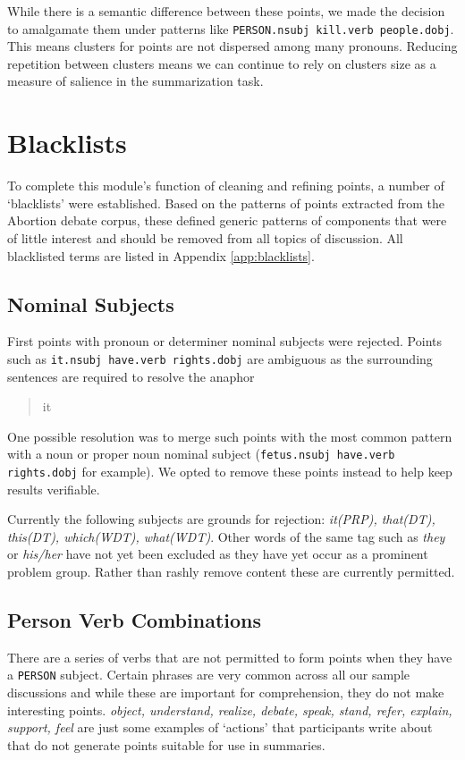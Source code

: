     While there is a semantic difference between these points, we made the decision to amalgamate them under patterns like \texttt{PERSON.nsubj kill.verb people.dobj}. This means clusters for points are not dispersed among many pronouns. Reducing repetition between clusters means we can continue to rely on clusters size as a measure of salience in the summarization task.

  \section{Blacklists}
  To complete this module's function of cleaning and refining points, a number of `blacklists' were established. Based on the patterns of points extracted from the Abortion debate corpus, these defined generic patterns of components that were of little interest and should be removed from all topics of discussion. All blacklisted terms are listed in Appendix \ref{app:blacklists}.

    \tocless\subsection{Nominal Subjects}
    First points with pronoun or determiner nominal subjects were rejected. Points such as \texttt{it.nsubj have.verb rights.dobj} are ambiguous as the surrounding sentences are required to resolve the anaphor \blockquote{it}. One possible resolution was to merge such points with the most common pattern with a noun or proper noun nominal subject (\texttt{fetus.nsubj have.verb rights.dobj} for example). We opted to remove these points instead to help keep results verifiable.

      Currently the following subjects are grounds for rejection: \textit{it(PRP), that(DT), this(DT), which(WDT), what(WDT)}. Other words of the same tag such as \textit{they} or \textit{his/her} have not yet been excluded as they have yet occur as a prominent problem group. Rather than rashly remove content these are currently permitted.

    \tocless\subsection{Person Verb Combinations}
      There are a series of verbs that are not permitted to form points when they have a \texttt{PERSON} subject. Certain phrases are very common across all our sample discussions and while these are important for comprehension, they do not make interesting points. \textit{object, understand, realize, debate, speak, stand, refer, explain, support, feel} are just some examples of `actions' that participants write about that do not generate points suitable for use in summaries.

